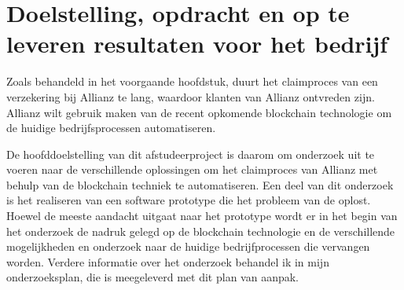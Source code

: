 \chapter{Doelstelling, opdracht en op te leveren resultaten voor het bedrijf}
Zoals behandeld in het voorgaande hoofdstuk, duurt het claimproces van een verzekering bij Allianz te lang, waardoor klanten van Allianz ontvreden zijn. Allianz wilt gebruik maken van de recent opkomende blockchain technologie om de huidige bedrijfsprocessen automatiseren.\par
De hoofddoelstelling van dit afstudeerproject is daarom om onderzoek uit te voeren naar de verschillende oplossingen om het claimproces van Allianz met behulp van de blockchain techniek te automatiseren. Een deel van dit onderzoek is het realiseren van een software prototype die het probleem van de oplost. Hoewel de meeste aandacht uitgaat naar het prototype wordt er in het begin van het onderzoek de nadruk gelegd op de blockchain technologie en de verschillende mogelijkheden en onderzoek naar de huidige bedrijfprocessen die vervangen worden. Verdere informatie over het onderzoek behandel ik in mijn onderzoeksplan, die is meegeleverd met dit plan van aanpak.